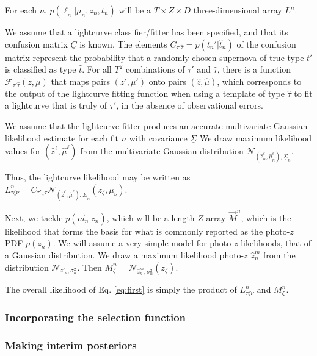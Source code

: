 \documentclass[12pt, onecolumn]{emulateapj}
\newcommand{\textul}{\underline}
\begin{document}
For each $n$, $p(\textul{\ell}_{n} | \mu_{n}, z_{n}, t_{n})$ will be a $T\times Z\times D$ three-dimensional array $\textul{L}^{n}$.  

We assume that a lightcurve classifier/fitter has been specified, and that its confusion matrix $\textul{C}$ is known.  The elements $C_{\tau'\hat{\tau}} = p(t_{n}' | \hat{t}_{n})$ of the confusion matrix represent the probability that a randomly chosen supernova of true type $t'$ is classified as type $\hat{t}$.  For all $T^{2}$ combinations of $\tau'$ and $\hat{\tau}$, there is a function $\mathcal{F}_{\tau'\hat{\tau}}(z, \mu)$ that maps pairs $(z', \mu')$ onto pairs $(\hat{z}, \hat{\mu})$, which corresponds to the output of the lightcurve fitting function when using a template of type $\hat{\tau}$ to fit a lightcurve that is truly of $\tau'$, in the absence of observational errors.  

We assume that the lightcurve fitter produces an accurate multivariate Gaussian likelihood estimate for each fit $n$ with covariance $\textul{\Sigma}$  We draw maximum likelihood values for $(\hat{z}^{\ell}, \hat{\mu}^{\ell})$ from the multivariate Gaussian distribution $\mathcal{N}_{(\hat{z}^{\ell}_{n}, \hat{\mu}^{\ell}_{n}), \textul{\Sigma}_{n}}$.  

Thus, the lightcurve likelihood may be written as $L^{n}_{\tau\zeta\nu} = C_{\tau'_{n}\tau}\mathcal{N}_{(\hat{z}^{\ell}, \hat{\mu}^{\ell}), \textul{\Sigma}_{n}}(z_{\zeta}, \mu_{\nu})$.

Next, we tackle $p(\vec{m}_{n} | z_{n})$, which will be a length $Z$ array $\vec{M}^{n}$, which is the likelihood that forms the basis for what is commonly reported as the photo-$z$ PDF $p(z_{n})$.   We will assume a very simple model for photo-$z$ likelihoods, that of a Gaussian distribution.  We draw a maximum likelihood photo-$z$ $\hat{z}_{n}^{m}$ from the distribution $\mathcal{N}_{z'_{n}, \sigma_{n}^{2}}$.  Then $M^{n}_{\zeta}=\mathcal{N}_{\hat{z}_{n}^{m}, \sigma_{n}^{2}}(z_{\zeta})$.

The overall likelihood of Eq. \ref{eq:first} is simply the product of $L^{n}_{\tau\zeta\nu}$ and $M^{n}_{\zeta}$.

\subsubsection{Incorporating the selection function}
\label{sec:selectionfunctions}

\subsubsection{Making interim posteriors}
\label{sec:interimpriors}
\end{document}
